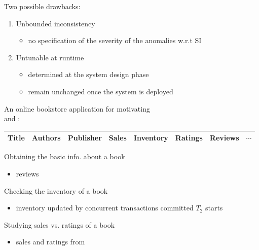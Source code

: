 \begin{frame}{}
  Two possible drawbacks:
  \begin{enumerate}
    \setlength{\itemsep}{8pt}
    \item Unbounded inconsistency
      \begin{itemize}
	\item no specification of the severity of the anomalies w.r.t SI
      \end{itemize}
    \pause
    \item Untunable at runtime
      \begin{itemize}
	\setlength{\itemsep}{5pt}
	\item determined at the system design phase
	\item remain unchanged once the system is deployed
      \end{itemize}
  \end{enumerate}
\end{frame}

\begin{frame}{}
  \begin{center}
    An online bookstore application for motivating \\
     and :
  \end{center}

  \vspace{-0.50cm}
  \begin{table}
    \centering
    \begin{tabular}{|c|c|c|c|c|c|c|c|}
      \hline
      Title & Authors & Publisher & Sales & Inventory & Ratings & Reviews & $\cdots$ \\
      \hline
    \end{tabular}
  \end{table}

  \pause
  \vspace{0.40cm}
  \begin{description}
    \setlength{\itemsep}{6pt}
    \item[Customer ($T_1$):] Obtaining the basic info. about a book
      \begin{itemize}
	\item \emph{} reviews
      \end{itemize}
      \pause
    \item[Bookstore Clerk ($T_2$):] Checking the inventory of a book
      \begin{itemize}
	\item inventory updated by concurrent transactions committed \emph{} $T_2$ starts
      \end{itemize}
      \pause
    \item[Sales Analyst ($T_3$):] Studying sales vs. ratings of a book
      \begin{itemize}
	\item sales and ratings from \emph{}
      \end{itemize}
  \end{description}
\end{frame}

